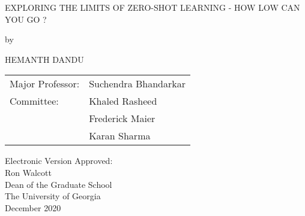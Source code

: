 \thispagestyle{empty}
\begin{center}
    EXPLORING THE LIMITS OF ZERO-SHOT LEARNING - HOW LOW CAN YOU GO ?
    
    \vspace*{1\baselineskip}
    by
    \vspace*{1\baselineskip}

    HEMANTH DANDU
\end{center}

\vspace*{6\baselineskip}

\iffalse
\begin{flushright}
Major Professor: $\hskip 0.5em$ Suchendra Bhandarkar
\vspace{\baselineskip}

Committee: \hspace{12pt} $\hskip 2.25em$ Khaled Rasheed \hspace{12pt}\\
Frederick Maier  \\
Karan Sharma  
\end{flushright}
\fi

\begin{flushright}
  \begin{tabular}{ll}
 Major Professor: &Suchendra Bhandarkar \\  [10pt]
    Committee: &Khaled Rasheed \\
    &Frederick Maier \\
    &Karan Sharma \\
  \end{tabular}
\end{flushright}
\vspace*{3cm}


\vspace{3\baselineskip}
\noindent
Electronic Version Approved:\\
Ron Walcott\\
Dean of the Graduate School\\
The University of Georgia\\
December 2020
\newpage